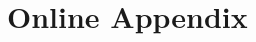 \documentclass[finalmode,PP]{AEA}
\begin{document}



\appendix


%

\section{Online Appendix}

\end{document}
